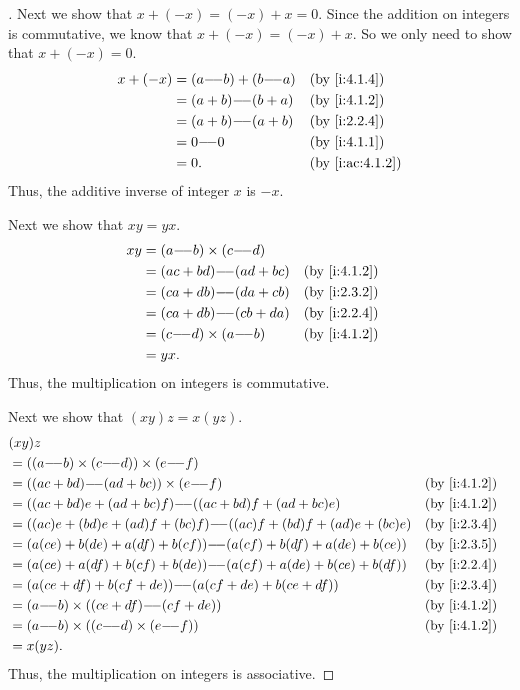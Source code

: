 \begin{proof}[]
  Next we show that \(x + (-x) = (-x) + x = 0\).
  Since the addition on integers is commutative, we know that \(x + (-x) = (-x) + x\).
  So we only need to show that \(x + (-x) = 0\).
  \begin{align*}
    x + (-x) & = (a \mm b) + (b \mm a) &  & \by{i:4.1.4}    \\
             & = (a + b) \mm (b + a)   &  & \by{i:4.1.2}    \\
             & = (a + b) \mm (a + b)   &  & \by{i:2.2.4}    \\
             & = 0 \mm 0               &  & \by{i:4.1.1}    \\
             & = 0.                    &  & \by{i:ac:4.1.2}
  \end{align*}
  Thus, the additive inverse of integer \(x\) is \(-x\).

  Next we show that \(xy = yx\).
  \begin{align*}
    xy & = (a \mm b) \times (c \mm d)                   \\
       & = (ac + bd) \mm (ad + bc)    &  & \by{i:4.1.2} \\
       & = (ca + db) \mm (da + cb)    &  & \by{i:2.3.2} \\
       & = (ca + db) \mm (cb + da)    &  & \by{i:2.2.4} \\
       & = (c \mm d) \times (a \mm b) &  & \by{i:4.1.2} \\
       & = yx.
  \end{align*}
  Thus, the multiplication on integers is commutative.

  Next we show that \((xy)z = x(yz)\).
  \begin{align*}
     & (xy)z                                                                                   \\
     & = ((a \mm b) \times (c \mm d)) \times (e \mm f)                                         \\
     & = ((ac + bd) \mm (ad + bc)) \times (e \mm f)                          &  & \by{i:4.1.2} \\
     & = ((ac + bd)e + (ad + bc)f) \mm ((ac + bd)f + (ad + bc)e)             &  & \by{i:4.1.2} \\
     & = ((ac)e + (bd)e + (ad)f + (bc)f) \mm ((ac)f + (bd)f + (ad)e + (bc)e) &  & \by{i:2.3.4} \\
     & = (a(ce) + b(de) + a(df) + b(cf)) \mm (a(cf) + b(df) + a(de) + b(ce)) &  & \by{i:2.3.5} \\
     & = (a(ce) + a(df) + b(cf) + b(de)) \mm (a(cf) + a(de) + b(ce) + b(df)) &  & \by{i:2.2.4} \\
     & = (a(ce + df) + b(cf + de)) \mm (a(cf + de) + b(ce + df))             &  & \by{i:2.3.4} \\
     & = (a \mm b) \times ((ce + df) \mm (cf + de))                          &  & \by{i:4.1.2} \\
     & = (a \mm b) \times ((c \mm d) \times (e \mm f))                       &  & \by{i:4.1.2} \\
     & = x(yz).
  \end{align*}
  Thus, the multiplication on integers is associative.


\end{proof}
